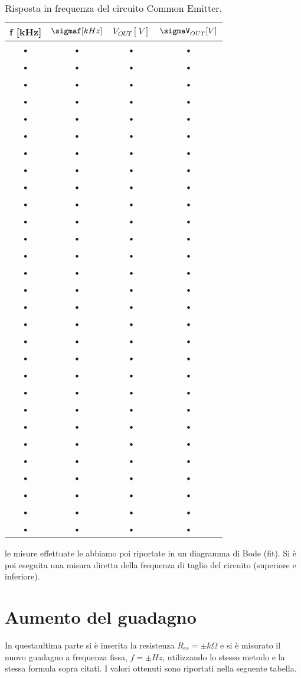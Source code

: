 \documentclass[10pt,a4paper]{article}
\begin{document}
{{\begin{table}[h]
\centering
\begin{tabular}{|c|c|c|c|}
\hline 
f [kHz] & $\sigmaf [kHz]$ & $V_{OUT} [V]$ & $\sigmaV_{OUT} [V]$ \\ 
\hline 
• & • & • & • \\ 
\hline 
• & • & • & • \\ 
\hline 
• & • & • & • \\ 
\hline 
• & • & • & • \\ 
\hline 
• & • & • & • \\ 
\hline 
• & • & • & • \\ 
\hline 
• & • & • & • \\ 
\hline 
• & • & • & • \\ 
\hline 
• & • & • & • \\ 
\hline 
• & • & • & • \\ 
\hline 
• & • & • & • \\ 
\hline 
• & • & • & • \\ 
\hline 
• & • & • & • \\ 
\hline 
• & • & • & • \\ 
\hline 
• & • & • & • \\ 
\hline 
• & • & • & • \\ 
\hline 
• & • & • & • \\ 
\hline 
• & • & • & • \\ 
\hline 
• & • & • & • \\ 
\hline 
• & • & • & • \\ 
\hline 
• & • & • & • \\ 
\hline 
• & • & • & • \\ 
\hline 
• & • & • & • \\ 
\hline 
• & • & • & • \\ 
\hline 
• & • & • & • \\ 
\hline 
• & • & • & • \\ 
\hline 
• & • & • & • \\ 
\hline 
• & • & • & • \\ 
\hline 
• & • & • & • \\ 
\hline 
\end{tabular} 
\caption{Risposta in frequenza del circuito Common Emitter.}
\end{table}
le misure effettuate le abbiamo poi riportate in un diagramma di Bode (fit).
Si è poi eseguita una misura diretta della frequenza di taglio del circuito (superiore e inferiore).

\section{Aumento del guadagno}
In questaultima parte si è inserita la resistenza $R_{es}= \pm k\Omega$ e si è misurato il nuovo guadagno a frequenza fissa, $f= \pm Hz$, utilizzando lo stesso metodo e la stessa formula sopra citati. I valori ottenuti sono riportati nella seguente tabella.

}}
\end{document}
